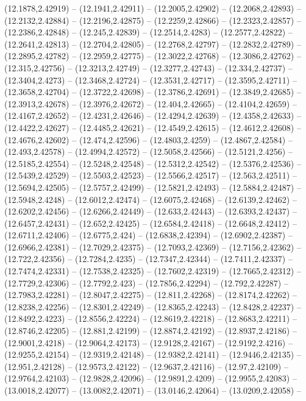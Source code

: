 {(12.1878,2.42919) -- (12.1941,2.42911) -- (12.2005,2.42902) -- (12.2068,2.42893) -- (12.2132,2.42884) -- (12.2196,2.42875) -- (12.2259,2.42866) -- (12.2323,2.42857) -- (12.2386,2.42848) -- (12.245,2.42839) -- (12.2514,2.4283) -- (12.2577,2.42822) --
(12.2641,2.42813) -- (12.2704,2.42805) -- (12.2768,2.42797) -- (12.2832,2.42789) -- (12.2895,2.42782) -- (12.2959,2.42775) -- (12.3022,2.42768) -- (12.3086,2.42762) -- (12.315,2.42756) -- (12.3213,2.42749) -- (12.3277,2.42743) -- (12.334,2.42737) --
(12.3404,2.4273) -- (12.3468,2.42724) -- (12.3531,2.42717) -- (12.3595,2.42711) -- (12.3658,2.42704) -- (12.3722,2.42698) -- (12.3786,2.42691) -- (12.3849,2.42685) -- (12.3913,2.42678) -- (12.3976,2.42672) -- (12.404,2.42665) -- (12.4104,2.42659) --
(12.4167,2.42652) -- (12.4231,2.42646) -- (12.4294,2.42639) -- (12.4358,2.42633) -- (12.4422,2.42627) -- (12.4485,2.42621) -- (12.4549,2.42615) -- (12.4612,2.42608) -- (12.4676,2.42602) -- (12.474,2.42596) -- (12.4803,2.4259) -- (12.4867,2.42584) --
(12.493,2.42578) -- (12.4994,2.42572) -- (12.5058,2.42566) -- (12.5121,2.4256) -- (12.5185,2.42554) -- (12.5248,2.42548) -- (12.5312,2.42542) -- (12.5376,2.42536) -- (12.5439,2.42529) -- (12.5503,2.42523) -- (12.5566,2.42517) -- (12.563,2.42511) --
(12.5694,2.42505) -- (12.5757,2.42499) -- (12.5821,2.42493) -- (12.5884,2.42487) -- (12.5948,2.4248) -- (12.6012,2.42474) -- (12.6075,2.42468) -- (12.6139,2.42462) -- (12.6202,2.42456) -- (12.6266,2.42449) -- (12.633,2.42443) -- (12.6393,2.42437) --
(12.6457,2.42431) -- (12.652,2.42425) -- (12.6584,2.42418) -- (12.6648,2.42412) -- (12.6711,2.42406) -- (12.6775,2.424) -- (12.6838,2.42394) -- (12.6902,2.42387) -- (12.6966,2.42381) -- (12.7029,2.42375) -- (12.7093,2.42369) -- (12.7156,2.42362) --
(12.722,2.42356) -- (12.7284,2.4235) -- (12.7347,2.42344) -- (12.7411,2.42337) -- (12.7474,2.42331) -- (12.7538,2.42325) -- (12.7602,2.42319) -- (12.7665,2.42312) -- (12.7729,2.42306) -- (12.7792,2.423) -- (12.7856,2.42294) -- (12.792,2.42287) --
(12.7983,2.42281) -- (12.8047,2.42275) -- (12.811,2.42268) -- (12.8174,2.42262) -- (12.8238,2.42256) -- (12.8301,2.42249) -- (12.8365,2.42243) -- (12.8428,2.42237) -- (12.8492,2.4223) -- (12.8556,2.42224) -- (12.8619,2.42218) -- (12.8683,2.42211) --
(12.8746,2.42205) -- (12.881,2.42199) -- (12.8874,2.42192) -- (12.8937,2.42186) -- (12.9001,2.4218) -- (12.9064,2.42173) -- (12.9128,2.42167) -- (12.9192,2.4216) -- (12.9255,2.42154) -- (12.9319,2.42148) -- (12.9382,2.42141) -- (12.9446,2.42135) --
(12.951,2.42128) -- (12.9573,2.42122) -- (12.9637,2.42116) -- (12.97,2.42109) -- (12.9764,2.42103) -- (12.9828,2.42096) -- (12.9891,2.4209) -- (12.9955,2.42083) -- (13.0018,2.42077) -- (13.0082,2.42071) -- (13.0146,2.42064) -- (13.0209,2.42058) --
}
